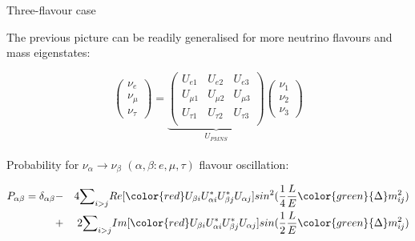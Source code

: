 \begin{frame}{Three-flavour case}

The previous picture can be readily generalised for
more neutrino flavours and mass eigenstates:

  \begin{equation}
   \nonumber
   \begin{pmatrix}
    \nu_{e}\\ \nu_{\mu}\\ \nu_{\tau}
   \end{pmatrix}
   =
   \underbrace{
   \begin{pmatrix}
     U_{e1} & U_{e2} & U_{e3} \\
     U_{\mu1} & U_{\mu2} & U_{\mu3} \\
     U_{\tau1} & U_{\tau2} & U_{\tau3} \\
   \end{pmatrix}
   }_\text{$U_{PMNS}$}
   \begin{pmatrix}
    \nu_{1}\\ \nu_{2}\\ \nu_{3}
   \end{pmatrix}
  \end{equation}\\

  Probability for $\nu_{\alpha}\rightarrow\nu_{\beta}$ $(\alpha, \beta: e, \mu, \tau)$ flavour oscillation:

  \begin{eqnarray}
  \nonumber
  \displaystyle
  P_{\alpha\beta} = \delta_{\alpha\beta}
    & - &
      4 {\sum}_{i>j}Re[{\color{red}U_{{\beta}i}U_{{\alpha}i}^{*}U_{{\beta}j}^{*}U_{{\alpha}j}}]
          sin^{2}(\frac{1}{4} \frac{L}{E} {\color{green}{\Delta}m^{2}_{ij}}) \\
    & + &
      2 {\sum}_{i>j}Im[{\color{red}U_{{\beta}i}U_{{\alpha}i}^{*}U_{{\beta}j}^{*}U_{{\alpha}j}}]
          sin(\frac{1}{2} \frac{L}{E} {\color{green}{\Delta}m^{2}_{ij}})
  \nonumber
  \end{eqnarray}

\end{frame}

%
%
%

